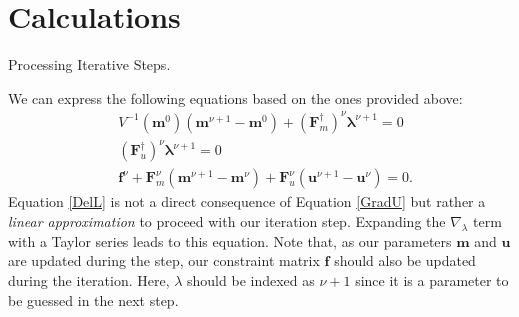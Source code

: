 \documentclass[
	xcolor=dvipsnames,
	aspectratio=169,	
	10pt, 
	]{beamer}
\begin{document}
\section{Calculations}
\begin{frame}{Processing Iterative Steps.}
	\begin{block}{}
		We can express the following equations based on the ones provided above:
		\begin{align}
			&V^{-1}(\mathbf m^0)(\mathbf{m}^{\nu+1}-\mathbf{m}^0)+(\mathbf{F}_m^\dagger)^\nu\mathbf\lambda^{\nu+1}=0\label{DelM}\\
			&(\mathbf{F}_u^\dagger)^\nu\mathbf\lambda^{\nu+1}=0\label{DelU}\\
			&\mathbf f^\nu + \mathbf F^\nu_m (\mathbf m^{\nu+1}-\mathbf m^\nu) + \mathbf F^\nu_u(\mathbf u^{\nu+1}-\mathbf u^\nu)=0\label{DelL}.
		\end{align}
		Equation \eqref{DelL} is not a direct consequence of Equation \eqref{GradU} but rather a \textit{linear approximation} to proceed with our iteration step. Expanding the $\nabla_\lambda$ term with a Taylor series leads to this equation. 
		Note that, as our parameters $\mathbf m$ and $\mathbf u$ are updated during the step, our constraint matrix $\mathbf f$ should also be updated during the iteration. Here, $\lambda$ should be indexed as $\nu+1$ since it is a parameter to be guessed in the next step.
	\end{block}
\end{frame}
\end{document}
